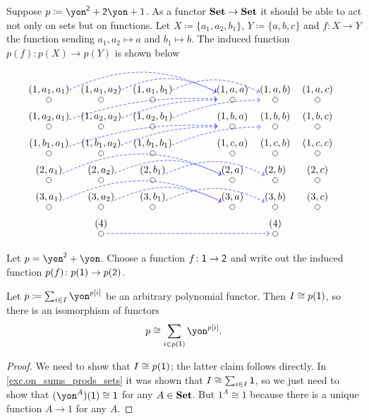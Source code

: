 \documentclass[DynamicalBook]{subfiles}
\begin{document}
\begin{example}
Suppose $p\coloneqq\yon^\2+\2\yon+1$. As a functor $\textbf{Set}\to\textbf{Set}$ it should be able to act not only on sets but on functions. Let $X\coloneqq\{a_1,a_2,b_1\}$, $Y\coloneqq\{a,b,c\}$ and $f\colon X\to Y$ the function sending $a_1,a_2\mapsto a$ and $b_1\mapsto b$. The induced function $p(f)\colon p(X)\to p(Y)$ is shown below
\[
\begin{tikzcd}[row sep=2pt, column sep=3pt, shorten <=-5pt, shorten >=-5pt, dashed]
\LMO{(1,a_1,a_1)}\ar[rrrr, blue, bend left=25pt]&\LMO{(1,a_1,a_2)}\ar[rrr, blue, bend left=25pt]&\LMO{(1,a_1,b_1)}\ar[rrr, blue, bend left=25pt]&[30pt]&
\LMO{(1,a,a)}&\LMO{(1,a,b)}&\LMO{(1,a,c)}&&
\\
\LMO{(1,a_2,a_1)}\ar[rrrru, blue, bend left=10pt]&\LMO{(1,a_2,a_2)}\ar[rrru, blue, bend left=10pt]&\LMO{(1,a_2,b_1)}\ar[rrru, blue, bend left=10pt]&&
\LMO{(1,b,a)}&\LMO{(1,b,b)}&\LMO{(1,b,c)}&&
\\
\LMO{(1,b_1,a_1)}\ar[rrrru, blue, bend left=10pt]&\LMO{(1,b_1,a_2)}\ar[rrru, blue, bend left=10pt]&\LMO{(1,b_1,b_1)}\ar[rrru, blue, bend left=10pt]&&
\LMO{(1,c,a)}&\LMO{(1,c,b)}&\LMO{(1,c,c)}&&
\\
\LMO{(2,a_1)}\ar[rrrr, blue, bend left=25pt]&\LMO{(2,a_2)}\ar[rrr, blue, bend left=25pt]&\LMO{(2,b_1)}\ar[rrr, blue, bend left=25pt]&&
\LMO{(2,a)}&\LMO{(2,b)}&\LMO{(2,c)}&&
\\
\LMO{(3,a_1)}\ar[rrrr, blue, bend left=25pt]&\LMO{(3,a_2)}\ar[rrr, blue, bend left=25pt]&\LMO{(3,b_1)}\ar[rrr, blue, bend left=25pt]&&
\LMO{(3,a)}&\LMO{(3,b)}&\LMO{(3,c)}&&
\\&
\LMO{(4)}\ar[rrrr, blue]&&&&\LMO{(4)}
\end{tikzcd}
\]
\end{example}

\begin{exercise}
Let $p=\yon^\2+\yon$. Choose a function $f\colon\textsf{1}\to\textsf{2}$ and write out the induced function $p(f)\colon p(\textsf{1})\to p(\textsf{2})$.
\end{exercise}

\begin{proposition}\label{prop.apply1}
Let $p\coloneqq\sum_{i\in I}\yon^{p[i]}$ be an arbitrary polynomial functor. Then $I\cong p(\textsf{1})$, so there is an isomorphism of functors
\begin{equation}\label{eqn.sum_p1}
p\cong\sum_{i\in p(\1)}\yon^{p[i]}.
\end{equation}
\end{proposition}
\begin{proof}
We need to show that $I\cong p(\textsf{1})$; the latter claim follows directly. In \cref{exc.on_sums_prods_sets} it was shown that $I\cong\sum_{i\in I}\textsf{1}$, so we just need to show that $(\yon^A)(\1)\cong\1$ for any $A\in\textbf{Set}$. But $1^A\cong 1$ because there is a unique function $A\to 1$ for any $A$.
\end{proof}
\end{document}
